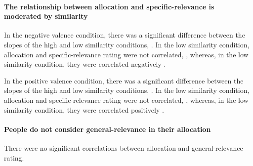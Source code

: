 \documentclass[a4paper, nobind, dvipsnames]{templates/ociamthesis}
\newcommand*{\bibtitle}{References}
\theoremstyle{definition}
\theoremstyle{definition}
\theoremstyle{definition}
\theoremstyle{definition}
\theoremstyle{remark}
\begin{document}
\paragraph{The relationship between allocation and specific-relevance is moderated by similarity}

In the negative valence condition, there was a significant difference between
the slopes of the high and low similarity conditions,
.
In the low similarity condition, allocation and specific-relevance rating were
not correlated,
,
whereas, in the low similarity condition, they were correlated negatively
.

In the positive valence condition, there was a significant difference between
the slopes of the high and low similarity conditions,
.
In the low similarity condition, allocation and specific-relevance rating were
not correlated,
,
whereas, in the low similarity condition, they were correlated positively
.

\paragraph{People do not consider general-relevance in their allocation}

There were no significant correlations between allocation and general-relevance
rating.




\setlength{\baselineskip}{0pt} %

{\renewcommand*\MakeUppercase[1]{#1}%
\printbibliography[heading=bibintoc,title={\bibtitle}]}
\end{document}
